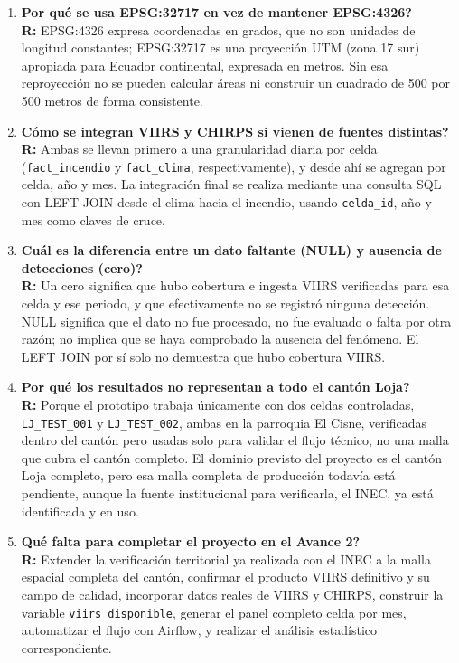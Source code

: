 \documentclass[11pt,a4paper]{article}
\begin{document}
\begin{enumerate}[leftmargin=1.2cm, itemsep=8pt, label=\textbf{P\arabic*.}]
\item \textbf{\textquestiondown Por qu\'e se usa EPSG:32717 en vez de
mantener EPSG:4326?}\\
\textbf{R:} EPSG:4326 expresa coordenadas en grados, que no son
unidades de longitud constantes; EPSG:32717 es una proyecci\'on UTM
(zona 17 sur) apropiada para Ecuador continental, expresada en metros.
Sin esa reproyecci\'on no se pueden calcular \'areas ni construir un
cuadrado de 500 por 500 metros de forma consistente.

\item \textbf{\textquestiondown C\'omo se integran VIIRS y CHIRPS si
vienen de fuentes distintas?}\\
\textbf{R:} Ambas se llevan primero a una granularidad diaria por
celda (\texttt{fact\-\_incendio} y \texttt{fact\-\_clima},
respectivamente), y desde ah\'i se agregan por celda, a\~no y mes. La
integraci\'on final
se realiza mediante una consulta SQL con LEFT JOIN desde el clima hacia
el incendio, usando \texttt{celda\_id}, a\~no y mes como claves de
cruce.

\item \textbf{\textquestiondown Cu\'al es la diferencia entre un dato
faltante (NULL) y ausencia de detecciones (cero)?}\\
\textbf{R:} Un cero significa que hubo cobertura e ingesta VIIRS
verificadas para esa celda y ese periodo, y que efectivamente no se
registr\'o ninguna detecci\'on. NULL significa que el dato no fue
procesado, no fue evaluado o falta por otra raz\'on; no implica que se
haya comprobado la ausencia del fen\'omeno. El LEFT JOIN por s\'i solo
no demuestra que hubo cobertura VIIRS.

\item \textbf{\textquestiondown Por qu\'e los resultados no representan
a todo el cant\'on Loja?}\\
\textbf{R:} Porque el prototipo trabaja \'unicamente con dos celdas
controladas, \texttt{LJ\_TEST\_001} y \texttt{LJ\_TEST\_002}, ambas en
la parroquia El Cisne, verificadas dentro del cant\'on pero usadas
solo para validar el flujo t\'ecnico, no una malla que cubra el
cant\'on completo. El dominio previsto del proyecto es el cant\'on
Loja completo, pero esa malla completa de producci\'on todav\'ia est\'a
pendiente, aunque la fuente institucional para verificarla, el INEC,
ya est\'a identificada y en uso.

\item \textbf{\textquestiondown Qu\'e falta para completar el proyecto
en el Avance 2?}\\
\textbf{R:} Extender la verificaci\'on territorial ya realizada con el
INEC a la malla espacial completa del cant\'on, confirmar el producto
VIIRS definitivo y su campo de calidad, incorporar datos reales de
VIIRS y CHIRPS, construir la variable \texttt{viirs\_disponible},
generar el panel completo celda por mes, automatizar el flujo con
Airflow, y realizar el an\'alisis estad\'istico correspondiente.


\end{enumerate}
\end{document}
